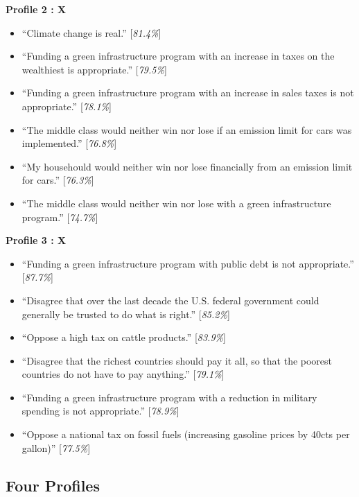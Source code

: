 \documentclass{article}
\begin{document}
\textbf{Profile 2 : X}
\begin{itemize}
\item ``Climate change is real.'' [\textit{81.4\%}]
\item ``Funding a green infrastructure program with an increase in taxes on the wealthiest is appropriate.'' [\textit{79.5\%}]
\item ``Funding a green infrastructure program with an increase in sales taxes is not appropriate.'' [\textit{78.1\%}]
\item ``The middle class would neither win nor lose if an emission limit for cars was implemented.'' [\textit{76.8\%}]
\item ``My househould would neither win nor lose financially from an emission limit for cars.'' [\textit{76.3\%}]
\item ``The middle class would neither win nor lose with a green infrastructure program.'' [\textit{74.7\%}]
\end{itemize}

\textbf{Profile 3 : X}
\begin{itemize}
\item ``Funding a green infrastructure program with public debt is not appropriate.'' [\textit{87.7\%}]
\item ``Disagree that over the last decade the U.S. federal government could generally be trusted to do what is right.'' [\textit{85.2\%}]
\item ``Oppose a high tax on cattle products.'' [\textit{83.9\%}]
\item ``Disagree that the richest countries should pay it all, so that the poorest countries do not have to pay anything.'' [\textit{79.1\%}]
\item ``Funding a green infrastructure program with a reduction in military spending is not appropriate.'' [\textit{78.9\%}]
\item ``Oppose a national tax on fossil fuels (increasing gasoline prices by 40cts per gallon)'' [\textit{77.5\%}]
\end{itemize}

\subsection{Four Profiles}
\end{document}
